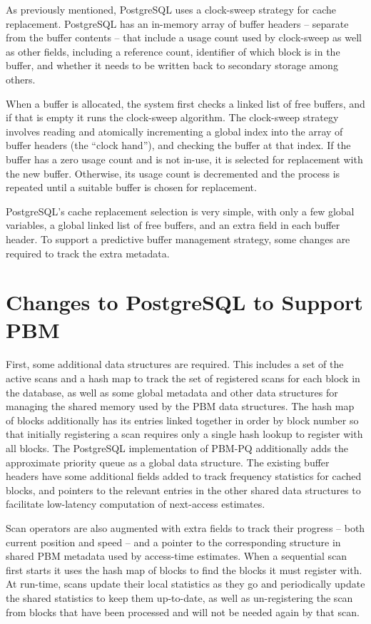 As previously mentioned, PostgreSQL uses a clock-sweep strategy for cache replacement. PostgreSQL has an in-memory array of buffer headers -- separate from the buffer contents -- that include a usage count used by clock-sweep as well as other fields, including a reference count, identifier of which block is in the buffer, and whether it needs to be written back to secondary storage among others.

When a buffer is allocated, the system first checks a linked list of free buffers, and if that is empty it runs the clock-sweep algorithm. The clock-sweep strategy involves reading and atomically incrementing a global index into the array of buffer headers (the ``clock hand''), and checking the buffer at that index. If the buffer has a zero usage count and is not in-use, it is selected for replacement with the new buffer. Otherwise, its usage count is decremented and the process is repeated until a suitable buffer is chosen for replacement.

PostgreSQL's cache replacement selection is very simple, with only a few global variables, a global linked list of free buffers, and an extra field in each buffer header. To support a predictive buffer management strategy, some changes are required to track the extra metadata.


\section{Changes to PostgreSQL to Support PBM}

First, some additional data structures are required. This includes a set of the active scans and a hash map to track the set of registered scans for each block in the database, as well as some global metadata and other data structures for managing the shared memory used by the PBM data structures. The hash map of blocks additionally has its entries linked together in order by block number so that initially registering a scan requires only a single hash lookup to register with all blocks. The PostgreSQL implementation of PBM-PQ additionally adds the approximate priority queue as a global data structure. The existing buffer headers have some additional fields added to track frequency statistics for cached blocks, and pointers to the relevant entries in the other shared data structures to facilitate low-latency computation of next-access estimates. 

Scan operators are also augmented with extra fields to track their progress -- both current position and speed -- and a pointer to the corresponding structure in shared PBM metadata used by access-time estimates. When a sequential scan first starts it uses the hash map of blocks to find the blocks it must register with. At run-time, scans update their local statistics as they go and periodically update the shared statistics to keep them up-to-date, as well as un-registering the scan from blocks that have been processed and will not be needed again by that scan.


